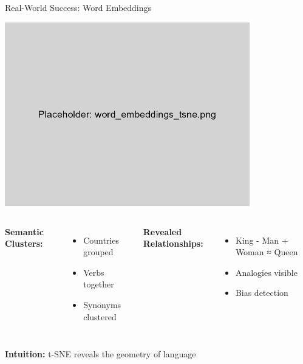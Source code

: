 \documentclass[aspectratio=169]{beamer}
\newcommand{\intuition}[1]{\colorbox{green!10}{\textcolor{intuitioncolor}{\textbf{Intuition:} #1}}}
\begin{document}
\begin{frame}{Real-World Success: Word Embeddings}
\begin{center}
\includegraphics[width=0.8\textwidth]{./Figures/word_embeddings_tsne.png}
\end{center}

\begin{columns}
\textbf{Semantic Clusters:}
\begin{itemize}
\item Countries grouped
\item Verbs together
\item Synonyms clustered
\end{itemize}

\textbf{Revealed Relationships:}
\begin{itemize}
\item King - Man + Woman ≈ Queen
\item Analogies visible
\item Bias detection
\end{itemize}
\end{columns}

\intuition{t-SNE reveals the geometry of language}
\end{frame}
\end{document}
